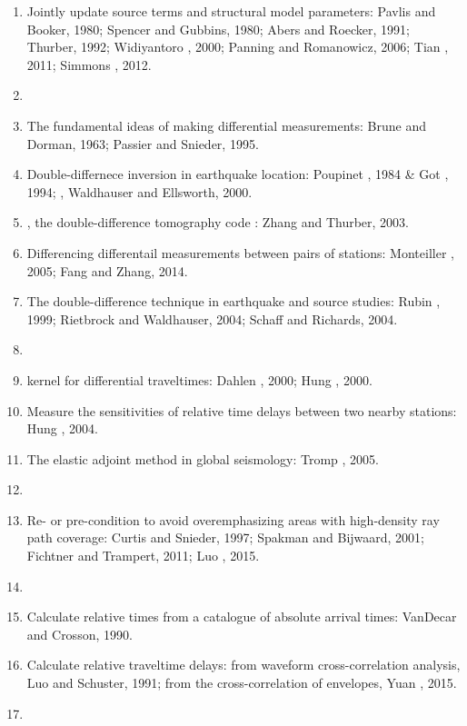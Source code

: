 \begin{enumerate}[\hspace{10mm}*]
  \item Jointly update source terms and structural model parameters:
    Pavlis and Booker, 1980; Spencer and Gubbins, 1980; Abers and Roecker, 1991;
    Thurber, 1992; Widiyantoro \etal, 2000; Panning and Romanowicz, 2006;
    Tian \etal, 2011; Simmons \etal, 2012.
  \item \sline
  \item The fundamental ideas of making differential measurements:
    Brune and Dorman, 1963; Passier and Snieder, 1995.
  \item Double-differnece inversion in earthquake location:
    Poupinet \etal, 1984 \& Got \etal, 1994; 
    ,
    Waldhauser and Ellsworth, 2000.
  \item {}, the double-difference tomography code
    :
    Zhang and Thurber, 2003.
  \item Differencing differentail measurements between pairs of stations:
    Monteiller \etal, 2005; Fang and Zhang, 2014.
  \item The double-difference technique in earthquake and source studies:
    Rubin \etal, 1999; Rietbrock and Waldhauser, 2004;
    Schaff and Richards, 2004.
  \item \sline
  \item \Frechet kernel for differential traveltimes:
    Dahlen \etal, 2000; Hung \etal, 2000.
  \item Measure the sensitivities of relative time delays between
    two nearby stations: Hung \etal, 2004.
  \item The elastic adjoint method in global seismology: Tromp \etal, 2005.
  \item \sline
  \item Re- or pre-condition to avoid overemphasizing areas with high-density
    ray path coverage: Curtis and Snieder, 1997; Spakman and Bijwaard, 2001;
    Fichtner and Trampert, 2011; Luo \etal, 2015.
  \item \sline
  \item Calculate relative times from a catalogue of absolute arrival times:
    VanDecar and Crosson, 1990.
  \item Calculate relative traveltime delays:
    from waveform cross-correlation analysis, Luo and Schuster, 1991;
    from the cross-correlation of envelopes, Yuan \etal, 2015.
  \item \sline

\end{enumerate}
